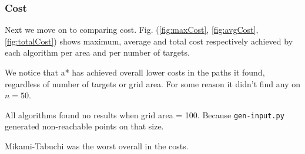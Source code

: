 \subsubsection{Cost}
Next we move on to comparing cost. Fig. (\ref{fig:maxCost}, \ref{fig:avgCost}, \ref{fig:totalCost}) shows maximum, average and total cost respectively achieved by each algorithm per area and per number of targets.

We notice that a* has achieved overall lower costs in the paths it found, regardless of number of targets or grid area. For some reason it didn't find any on $n=50$. 

All algorithms found no results when grid area = 100. Because \texttt{gen-input.py} generated non-reachable points on that size.

Mikami-Tabuchi was the worst overall in the costs.

